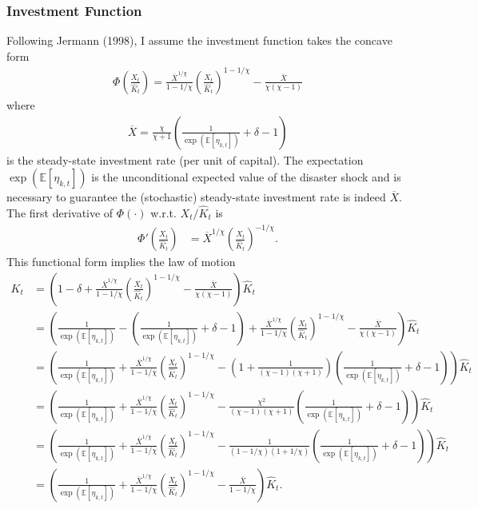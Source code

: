 \documentclass[12 pt, oneside]{article}
\theoremstyle{definition}
\theoremstyle{definition}
\theoremstyle{definition}
\newcommand{\E}{\mathbb{E}}
\begin{document}
\subsubsection{Investment Function}
Following Jermann (1998), I assume the investment function takes the concave form
\begin{align}\label{eq:invst fnct}
  \Phi\left(\frac{X_t}{\hat{K}_t}\right) = \frac{\overline{X}^{1/\chi}}{1 - 1/\chi}\left(\frac{X_t}{\hat{K}_t}\right)^{1 - 1/\chi} - \frac{\overline{X}}{\chi(\chi - 1)}
\end{align}
where
\begin{align}\label{eq:steady state invst rate defn}
\overline{X} = \frac{\chi}{\chi + 1}\left(\frac{1}{\exp(\E[\eta_{k, t}])} + \delta - 1\right)
\end{align}
is the steady-state investment rate (per unit of capital). The expectation $\exp(\E[\eta_{k, t}])$ is the unconditional expected value of the disaster shock and is necessary to guarantee the (stochastic) steady-state investment rate is indeed $\overline{X}$. The first derivative of $\Phi(\cdot)$ w.r.t. $X_t / \hat{K}_t$ is
\begin{align}\label{eq:invst fnct first deriv}
    \Phi'\left(\frac{X_t}{\hat{K}_t}\right) & = \overline{X}^{1/\chi}\left(\frac{X_t}{ \hat{K}_t}\right)^{-1/\chi}.
\end{align}
This functional form implies the law of motion
\begin{align*}
  K_t & = \left(1 - \delta + \frac{\overline{X}^{1/\chi}}{1 - 1/\chi}\left(\frac{X_t}{\hat{K}_t}\right)^{1 - 1/\chi} - \frac{\overline{X}}{\chi(\chi - 1)}\right)\hat{K}_t\\
 & = \left(\frac{1}{\exp(\E[\eta_{k, t}])} - \left(\frac{1}{\exp(\E[\eta_{k, t}])} + \delta - 1\right) + \frac{\overline{X}^{1/\chi}}{1 - 1/\chi}\left(\frac{X_t}{\hat{K}_t}\right)^{1 - 1/\chi} - \frac{\overline{X}}{\chi(\chi - 1)}\right)\hat{K}_t\\
      & = \left(\frac{1}{\exp(\E[\eta_{k, t}])} + \frac{\overline{X}^{1/\chi}}{1 - 1/\chi}\left(\frac{X_t}{\hat{K}_t}\right)^{1 - 1/\chi} - \left(1 +  \frac{1}{(\chi - 1)(\chi + 1)}\right)\left(\frac{1}{\exp(\E[\eta_{k, t}])} + \delta - 1\right) \right)\hat{K}_t \\
      & = \left(\frac{1}{\exp(\E[\eta_{k, t}])} + \frac{\overline{X}^{1/\chi}}{1 - 1/\chi}\left(\frac{X_t}{\hat{K}_t}\right)^{1 - 1/\chi} - \frac{\chi^2}{(\chi - 1)(\chi + 1)}\left(\frac{1}{\exp(\E[\eta_{k, t}])} + \delta - 1\right) \right)\hat{K}_t \\
      & = \left(\frac{1}{\exp(\E[\eta_{k, t}])} + \frac{\overline{X}^{1/\chi}}{1 - 1/\chi}\left(\frac{X_t}{\hat{K}_t}\right)^{1 - 1/\chi} - \frac{1}{(1 - 1 / \chi)(1 + 1 / \chi)}\left(\frac{1}{\exp(\E[\eta_{k, t}])} + \delta - 1\right) \right)\hat{K}_t \\
      & = \left(\frac{1}{\exp(\E[\eta_{k, t}])} + \frac{\overline{X}^{1/\chi}}{1 - 1/\chi}\left(\frac{X_t}{\hat{K}_t}\right)^{1 - 1/\chi} -\frac{\overline{X}}{1 - 1 / \chi}\right)\hat{K}_t.
\end{align*}
\end{document}
